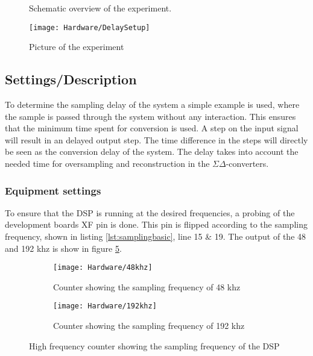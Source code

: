 \begin{figure}[H]
	\centering
	
	\caption{Schematic overview of the experiment.}
	\label{fig:SchematicDelayExperiment}
\end{figure}


\begin{figure}[H]
	\centering
\texttt{[image: Hardware/DelaySetup]}
	\caption{Picture of the experiment}
	\label{fig:DelayExperimentSetup}
\end{figure}


\subsection{Settings/Description}
To determine the sampling delay of the system a simple example is used, where the sample is passed through the system without any interaction. This ensures that the minimum time spent for conversion is used. A step on the input signal will result in an delayed output step. The time difference in the steps will directly be seen as the conversion delay of the system. The delay takes into account the needed time for oversampling and reconstruction in the $\Sigma\Delta$-converters.

\subsubsection{Equipment settings}
To ensure that the DSP is running at the desired frequencies, a probing of the development boards XF pin is done. This pin is flipped according to the sampling frequency, shown in listing \ref{lst:samplingbasic}, line 15 \& 19. The output of the 48 and 192 khz is show in figure \ref{fig:countingthefs}. 
\begin{figure}[H]
	\centering
	\begin{subfigure}[b]{.45\textwidth}
		\centering
		\texttt{[image: Hardware/48khz]}
		\caption{Counter showing the sampling frequency of 48 khz}
		\label{fig:48khzcounter}
	\end{subfigure}
	\hfill
	\begin{subfigure}[b]{.45\textwidth}
		\centering
		\texttt{[image: Hardware/192khz]}
		\caption{Counter showing the sampling frequency of 192 khz}
		\label{fig:192khzcounter}
	\end{subfigure}	
	\caption{High frequency counter showing the sampling frequency of the DSP}
	\label{fig:countingthefs}
\end{figure}

